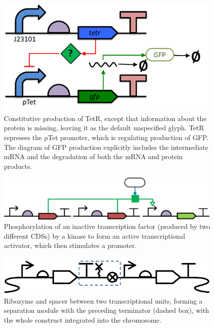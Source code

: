 \begin{figure}[h!]
\includegraphics[scale=0.5]{figures/apdx-examples/apdx-exa13.pdf}
\caption{Constitutive production of TetR, except that information about the protein is missing, leaving it as the default unspecified glyph. TetR represses the pTet promoter, which is regulating production of GFP.  The diagram of GFP production explicitly includes the intermediate mRNA and the degradation of both the mRNA and protein products.}
\label{f:apdx:exa13}
\end{figure}

\begin{figure}[h!]
\includegraphics[scale=0.5]{figures/apdx-examples/apdx-exa14.pdf}
\caption{Phosphorylation of an inactive transcription factor (produced by two different CDSs) by a kinase to form an active transcriptional activator, which then stimulates a promoter.}
\label{f:apdx:exa14}
\end{figure}

\begin{figure}[h!]
\includegraphics[scale=0.5]{figures/apdx-examples/apdx-exa15.pdf}
\caption{Ribozyme and spacer between two transcriptional units, forming a separation module with the preceding terminator (dashed box), with the whole construct integrated into the chromosome.}
\label{f:apdx:exa15}
\end{figure}

